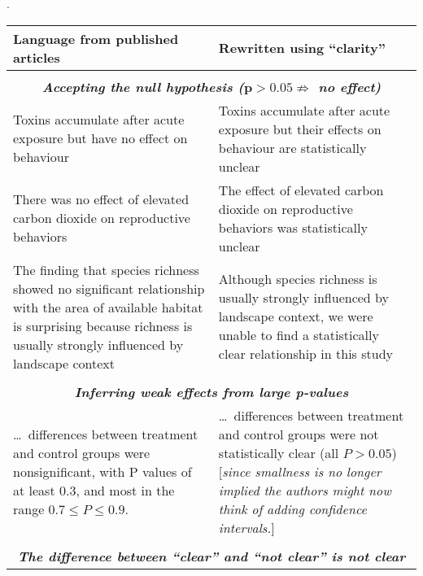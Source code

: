\documentclass[12pt, english, dvipsnames, table]{article} %
\newcommand{\pvals}{p-values\xspace}
\begin{document}
\newcommand{\ourcomment}[1]{[\emph{#1}]}
\begin{table}
\setlength\tabcolsep{1cm}.
\begin{tabular}{p{7.0cm}p{7.0cm}}
\textbf{Language from published articles} & \textbf{Rewritten using ``clarity''} \\
\hline\\

\multicolumn{2}{c}{\emph{\textbf{Accepting the null hypothesis ($\boldsymbol{p > 0.05 \nRightarrow}$ no effect)}}} \\
\hline

Toxins accumulate after acute exposure but have no effect on behaviour
& Toxins accumulate after acute exposure but their effects on behaviour are statistically unclear
\\

\rowcolor{vlg}
There was no effect of elevated carbon dioxide on reproductive behaviors 
& The effect of elevated carbon dioxide on reproductive behaviors was statistically unclear
\\

The finding that species richness showed no significant relationship with the area of available habitat is surprising because richness is usually strongly influenced by landscape context 
& Although species richness is usually strongly influenced by landscape context, we were unable to find a statistically clear relationship in this study
\\ \\

\multicolumn{2}{c}{\emph{\textbf{Inferring weak effects from large \pvals}} \citep{WassersteinandLazar2016}}
\\
\hline
\ldots\ differences between treatment and control groups were nonsignificant, with P values of at least 0.3, and most in the range $0.7 \leq P \leq 0.9$.
& \ldots\ differences between treatment and control groups were not statistically clear (all $P > 0.05$) \ourcomment{since smallness is no longer implied the authors might now think of adding confidence intervals.}
\\ \\

\multicolumn{2}{c}{\emph{\textbf{The difference between ``clear'' and ``not clear'' is not clear}} \citep{GelmanandStern2006}}
\\
\hline


\end{tabular}
\end{table}
\end{document}
